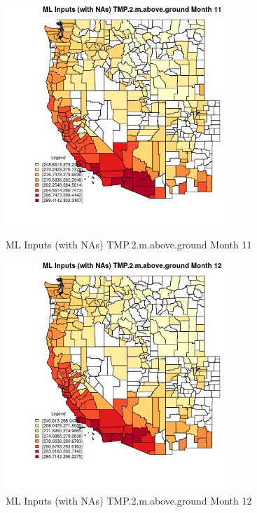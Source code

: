 \begin{figure} 
\centering  
\includegraphics[width=0.77\textwidth]{Code_Outputs/Report_ML_input_PM25_Step4_part_e_de_duplicated_aves_compiled_2019-05-21wNAs_CountyTMP2mabovegroundmedianMonth11.jpg} 
\caption{\label{fig:Report_ML_input_PM25_Step4_part_e_de_duplicated_aves_compiled_2019-05-21wNAsCountyTMP2mabovegroundmedianMonth11}ML Inputs (with NAs) TMP.2.m.above.ground Month 11} 
\end{figure} 
 

\begin{figure} 
\centering  
\includegraphics[width=0.77\textwidth]{Code_Outputs/Report_ML_input_PM25_Step4_part_e_de_duplicated_aves_compiled_2019-05-21wNAs_CountyTMP2mabovegroundmedianMonth12.jpg} 
\caption{\label{fig:Report_ML_input_PM25_Step4_part_e_de_duplicated_aves_compiled_2019-05-21wNAsCountyTMP2mabovegroundmedianMonth12}ML Inputs (with NAs) TMP.2.m.above.ground Month 12} 
\end{figure} 
 

